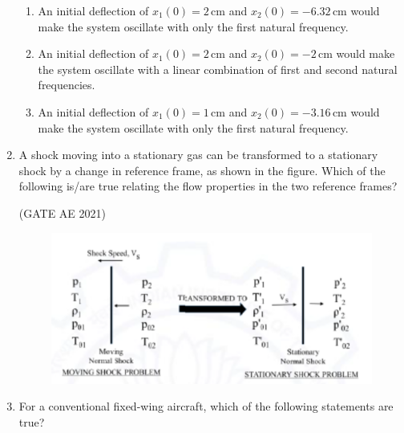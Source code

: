 \documentclass[journal,12pt,onecolumn]{IEEEtran}
\theoremstyle{remark}
\begin{document}
\begin{flushleft}
\begin{enumerate}
\begin{enumerate}
\item An initial deflection of $x_1(0) = 2 \, \text{cm}$ and $x_2(0) = -6.32 \, \text{cm}$ would make the system oscillate with only the first natural frequency.  

\item An initial deflection of $x_1(0) = 2 \, \text{cm}$ and $x_2(0) = -2 \, \text{cm}$ would make the system oscillate with a linear combination of first and second natural frequencies.  

\item An initial deflection of $x_1(0) = 1 \, \text{cm}$ and $x_2(0) = -3.16 \, \text{cm}$ would make the system oscillate with only the first natural frequency.  
\end{enumerate}

\item  
A shock moving into a stationary gas can be transformed to a stationary shock by a change in reference frame, as shown in the figure. Which of the following is/are true relating the flow properties in the two reference frames?

\hfill (GATE AE 2021)


\begin{figure}[H]
    \centering
    \includegraphics[width=0.5\columnwidth]{figs/dw.png}
    \caption{}
    \label{fig:placeholder}
\end{figure}

\begin{enumerate}
\end{enumerate}

\item  
For a conventional fixed-wing aircraft, which of the following statements are true?


\end{enumerate}
\end{flushleft}
\end{document}
